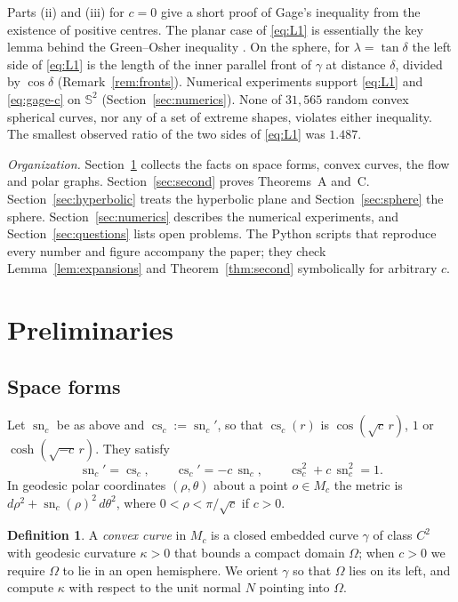 \documentclass[11pt]{amsart}
\theoremstyle{definition}
\newtheorem{definition}[theorem]{Definition}
\theoremstyle{remark}
\numberwithin{equation}{section}
\DeclareMathOperator{\sn}{sn}
\DeclareMathOperator{\cs}{cs}
\newcommand{\Sph}{\mathbb{S}}
\begin{document}
Parts (ii) and (iii) for $c=0$ give a short proof of Gage's inequality from the existence of positive centres. The planar case of \eqref{eq:L1} is essentially the key lemma behind the Green--Osher inequality \cite{GO99,PY08}. On the sphere, for $\lambda=\tan\delta$ the left side of \eqref{eq:L1} is the length of the inner parallel front of $\gamma$ at distance $\delta$, divided by $\cos\delta$ (Remark~\ref{rem:fronts}). Numerical experiments support \eqref{eq:L1} and \eqref{eq:gage-c} on $\Sph^2$ (Section~\ref{sec:numerics}). None of $31{,}565$ random convex spherical curves, nor any of a set of extreme shapes, violates either inequality. The smallest observed ratio of the two sides of \eqref{eq:L1} was $1.487$.

\medskip
\noindent\emph{Organization.} Section~\ref{sec:prelim} collects the facts on space forms, convex curves, the flow and polar graphs. Section~\ref{sec:second} proves Theorems~A and~C. Section~\ref{sec:hyperbolic} treats the hyperbolic plane and Section~\ref{sec:sphere} the sphere. Section~\ref{sec:numerics} describes the numerical experiments, and Section~\ref{sec:questions} lists open problems. The Python scripts that reproduce every number and figure accompany the paper; they check Lemma~\ref{lem:expansions} and Theorem~\ref{thm:second} symbolically for arbitrary $c$.

\section{Preliminaries}\label{sec:prelim}

\subsection{Space forms}
Let $\sn_c$ be as above and $\cs_c:=\sn_c'$, so that $\cs_c(r)$ is $\cos(\sqrt c\,r)$, $1$ or $\cosh(\sqrt{-c}\,r)$. They satisfy
\begin{equation}\label{eq:sncs}
\sn_c'=\cs_c,\qquad \cs_c'=-c\,\sn_c,\qquad \cs_c^2+c\,\sn_c^2=1 .
\end{equation}
In geodesic polar coordinates $(\rho,\theta)$ about a point $o\in M_c$ the metric is $d\rho^2+\sn_c(\rho)^2\,d\theta^2$, where $0<\rho<\pi/\sqrt c$ if $c>0$.

\begin{definition}\label{def:convex}
A \emph{convex curve} in $M_c$ is a closed embedded curve $\gamma$ of class $C^2$ with geodesic curvature $\kappa>0$ that bounds a compact domain $\Omega$; when $c>0$ we require $\Omega$ to lie in an open hemisphere. We orient $\gamma$ so that $\Omega$ lies on its left, and compute $\kappa$ with respect to the unit normal $N$ pointing into $\Omega$.
\end{definition}
\end{document}
